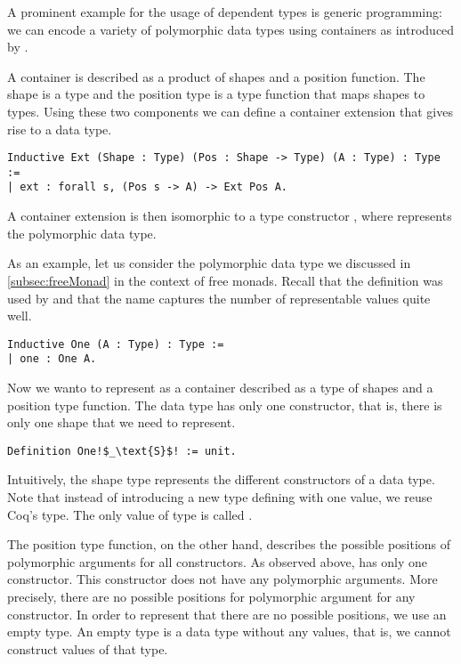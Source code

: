 A prominent example for the usage of dependent types is generic programming: we can encode a variety of polymorphic data types using containers as introduced by \citet{abbott2003categories}.

A container is described as a product of shapes and a position function.
The shape is a type  and the position type  is a type function that maps shapes to types.
Using these two components we can define a container extension that gives rise to a data type.

\begin{verbatim}
Inductive Ext (Shape : Type) (Pos : Shape -> Type) (A : Type) : Type :=
| ext : forall s, (Pos s -> A) -> Ext Pos A.
\end{verbatim}

A container extension  is then isomorphic to a type constructor , where  represents the polymorphic data type.

As an example, let us consider the polymorphic data type  we discussed in \autoref{subsec:freeMonad} in the context of free monads.
Recall that the definition was used by \citet{swierstra2008data} and that the name captures the number of representable values quite well.

\begin{verbatim}
Inductive One (A : Type) : Type :=
| one : One A.
\end{verbatim}

Now we wanto to represent  as a container described as a type of shapes and a position type function.
The data type  has only one constructor, that is, there is only one shape that we need to represent.

\begin{verbatim}
Definition One!$_\text{S}$! := unit.
\end{verbatim}

Intuitively, the shape type represents the different constructors of a data type.
Note that instead of introducing a new type defining with one value, we reuse Coq's  type.
The only value of type  is called .

The position type function, on the other hand, describes the possible positions of polymorphic arguments for all constructors.
As observed above,  has only one constructor.
This constructor  does not have any polymorphic arguments.
More precisely, there are no possible positions for polymorphic argument for any constructor.
In order to represent that there are no possible positions, we use an empty type.
An empty type is a data type without any values, that is, we cannot construct values of that type.

